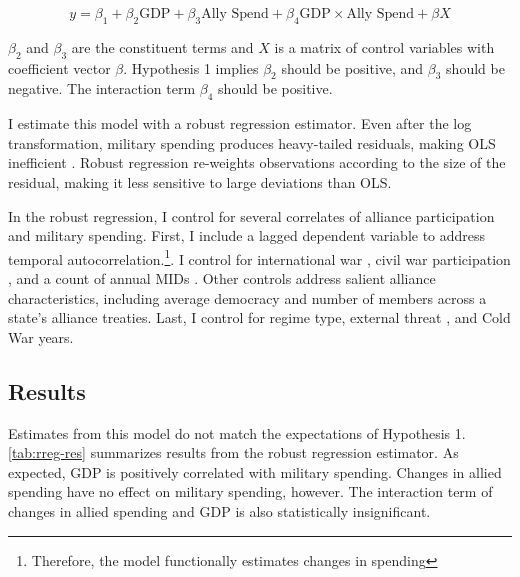 \documentclass[12pt]{article}
\begin{document}
\begin{equation} 
y = \beta_1 + \beta_2 \mbox{GDP} + \beta_3 \mbox{Ally Spend} + \beta_4 \mbox{GDP} \times \mbox{Ally Spend} + \beta X 
\end{equation}


$\beta_2$ and $\beta_3$ are the constituent terms and $X$ is a matrix of control variables with coefficient vector $\beta$.
Hypothesis 1 implies $\beta_2$ should be positive, and $\beta_3$ should be negative. 
The interaction term $\beta_4$ should be positive. 


I estimate this model with a robust regression estimator. 
Even after the log transformation, military spending produces heavy-tailed residuals, making OLS inefficient \citep{RaineyBaissa2018}. 
Robust regression re-weights observations according to the size of the residual, making it less sensitive to large deviations than OLS. 


In the robust regression, I control for several correlates of alliance participation and military spending. 
First, I include a lagged dependent variable to address temporal autocorrelation.\footnote{Therefore, the model functionally estimates changes in spending}.
I control for international war \citep{Reiteretal2016}, civil war participation \citep{SarkeesWayman2010}, and a count of annual MIDs \citep{Gibleretal2016}. 
Other controls address salient alliance characteristics, including average democracy and number of members across a state's alliance treaties.   
Last, I control for regime type, external threat \citep{LeedsSavun2007}, and Cold War years. 


\subsection{Results}


Estimates from this model do not match the expectations of Hypothesis 1. 
\autoref{tab:rreg-res} summarizes results from the robust regression estimator. 
As expected, GDP is positively correlated with military spending. 
Changes in allied spending have no effect on military spending, however. 
The interaction term of changes in allied spending and GDP is also statistically insignificant. 
\end{document}
